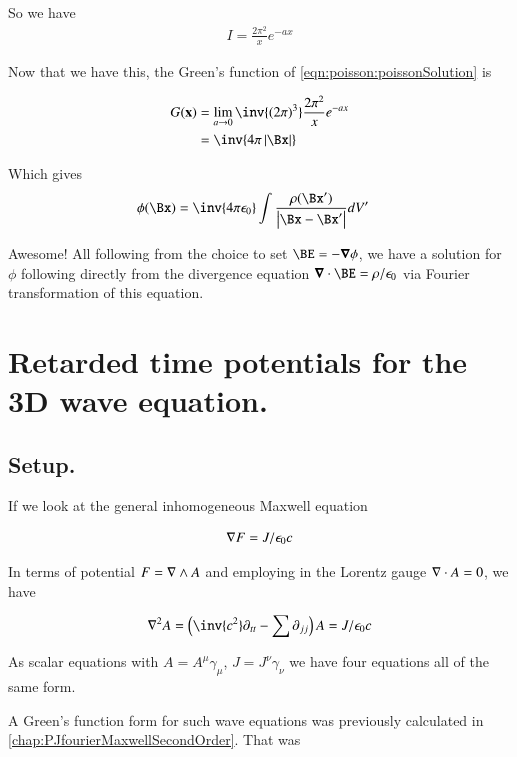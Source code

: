 So we have
\begin{align*}
I = \frac{2 \pi^2}{x} e^{ - a x }
\end{align*}

Now that we have this, the Green's function of \ref{eqn:poisson:poissonSolution} is

\begin{align*}
G(\mathbf{x})
&= \lim_{a \rightarrow 0} \inv{(2\pi)^3} \frac{2 \pi^2}{x} e^{ - a x } \\
&= \inv{4\pi\Abs{\Bx}}
\end{align*}

Which gives
\begin{align*}
\phi(\Bx) &= \inv{4\pi \epsilon_0} \int \frac{\rho(\Bx')}{\Abs{\Bx - \Bx'}} dV'
\end{align*}

Awesome!  All following from the choice to set $\BE = -\spacegrad \phi$, we have a solution for $\phi$ following directly
from the divergence equation $\spacegrad \cdot \BE = \rho/\epsilon_0$ via Fourier transformation of this equation.

\section{Retarded time potentials for the 3D wave equation. }

\subsection{Setup. }

If we look at the general inhomogeneous Maxwell equation

\begin{align}
\nabla F = J/\epsilon_0 c
\end{align}

In terms of potential $F = \nabla \wedge A$ and employing in the Lorentz gauge $\nabla \cdot A = 0$, we have

\begin{align}
\grad^2 A = \left(\inv{c^2} \partial_{tt} - \sum \partial_{jj}\right) A = J/\epsilon_0 c
\end{align}

As scalar equations with $A = A^\mu \gamma_\mu$, $J = J^\nu \gamma_\nu$ we have four equations all of the same form.

A Green's function form for such wave equations was previously calculated in \ref{chap:PJfourierMaxwellSecondOrder}.  That was

